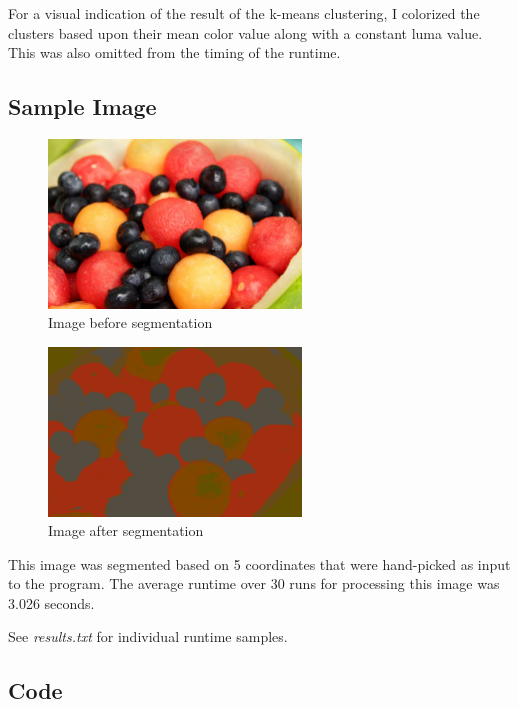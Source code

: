 \documentclass[11pt]{article}
\begin{document}
For a visual indication of the result of the k-means clustering, I colorized the clusters
based upon their mean color value along with a constant luma value. This was also omitted
from the timing of the runtime.

\subsection{Sample Image}

\begin{figure}[h]
    \centering
    \includegraphics[width=0.6\textwidth]{fruit.png}
    \caption{Image\cite{fruit} before segmentation}
    \label{fig:fruit}
\end{figure}

\begin{figure}[h]
    \centering
    \includegraphics[width=0.6\textwidth]{fruit-segmented.png}
    \caption{Image after segmentation}
    \label{fig:fruit-segmented}
\end{figure}

This image was segmented based on 5 coordinates that were hand-picked as input to the program.
The average runtime over 30 runs for processing this image was 3.026 seconds.

See \emph{results.txt} for individual runtime samples.

\subsection{Code}
\end{document}
